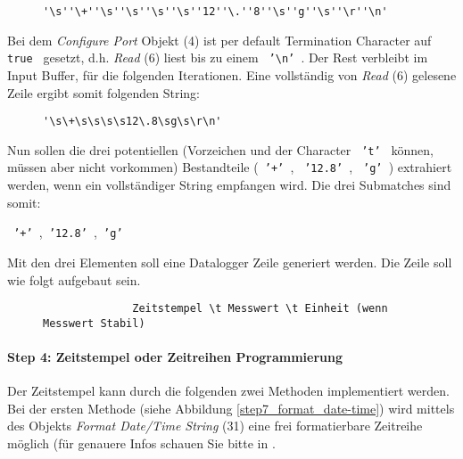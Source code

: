 \documentclass[
fontsize=12pt, 
paper=a4, 
BCOR=10mm, 
twoside=false,
 DIV=10, 
 headsepline, 
 footsepline
 ]{scrartcl}
\begin{document}
\begin{figure}[h!]
\centering
\begin{BVerbatim}
'\s''\+''\s''\s''\s''\s''12''\.''8''\s''g''\s''\r''\n'
\end{BVerbatim}
\end{figure}


Bei dem \textit{Configure Port} Objekt (4) ist per default Termination Character auf \texttt{ true } gesetzt, d.h. \textit{Read} (6) liest bis zu einem \texttt{ '\textbackslash n' }. Der Rest verbleibt im Input Buffer, für die folgenden Iterationen. Eine vollständig von \textit{Read} (6) gelesene Zeile ergibt somit folgenden String:


\begin{figure}[h!]
\centering
\begin{varwidth}{\linewidth}
\begin{verbatim}
'\s\+\s\s\s\s12\.8\sg\s\r\n'
\end{verbatim}
\end{varwidth}
\end{figure}


Nun sollen die drei potentiellen (Vorzeichen und der Character \texttt{ 't' } können, müssen aber nicht vorkommen) Bestandteile (\texttt{ '+' }, \texttt{ '12.8' }, \texttt{ 'g' }) extrahiert werden, wenn ein vollständiger String empfangen wird. Die drei Submatches sind somit:

\begin{center}  \texttt{ '+' },\texttt{ '12.8' },\texttt{ 'g' } \end{center}

Mit den drei Elementen soll eine Datalogger Zeile generiert werden. Die Zeile soll wie folgt aufgebaut sein.

\begin{figure}[h!]
\begin{center}
\begin{varwidth}{\linewidth}
\begin{verbatim}
              Zeitstempel \t Messwert \t Einheit (wenn Messwert Stabil)
\end{verbatim}
\end{varwidth}
\end{center}
\end{figure}


\paragraph{Step 4: Zeitstempel oder Zeitreihen Programmierung}  Der Zeitstempel kann durch die folgenden zwei Methoden implementiert werden. Bei der ersten Methode (siehe Abbildung \ref{step7_format_date-time}) wird mittels des Objekts \textit{Format Date/Time String} (31) eine frei formatierbare Zeitreihe möglich (für genauere Infos schauen Sie bitte in \cite{zeitreihenformatierung}.
\end{document}
